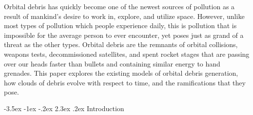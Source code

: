\documentclass[a4paper, 12pt]{article}
\makeatletter
\renewcommand\section{\clearpage\newpage\@startsection {section}{1}{\z@}%
	{-3.5ex \@plus -1ex \@minus -.2ex}%
	{2.3ex \@plus.2ex}%
	{\normalfont\Large\bfseries}}
\makeatother
\begin{document}
\myskip
\doublespace
Orbital debris has quickly become one of the newest sources of pollution as a result of mankind's desire to work in, explore, and utilize space. However, unlike most types of pollution which people experience daily, this is pollution that is impossible for the average person to ever encounter, yet poses just as grand of a threat as the other types. Orbital debris are the remnants of orbital collisions, weapons tests, decommissioned satellites, and spent rocket stages that are passing over our heads faster than bullets and containing similar energy to hand grenades. This paper explores the existing models of orbital debris generation, how clouds of debris evolve with respect to time, and the ramifications that they pose.
\singlespace
\newpage


\tableofcontents

\cleardoublepage
{}\listoffigures

\cleardoublepage
{}\listoftables

\glsaddall
\cleardoublepage
{}\printglossary[title={List of Symbols}, nonumberlist]



\newpage
\setlength{\parindent}{1em}



\section{Introduction}
\label{introduction}
\doublespace
\end{document}
